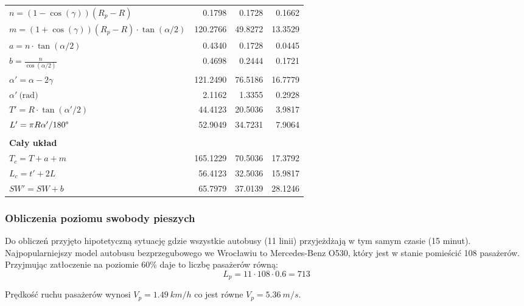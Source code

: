 \documentclass[twoside,12pt]{article}
\begin{document}
\begin{table}[H]
\begin{tabular}{lrrr}
     \midrule
     $n=(1-\cos(\gamma))(R_p-R)$ & 0.1798     & 0.1728     & 0.1662 \\
     $m=(1+\cos(\gamma))(R_p-R)\cdot\tan(\alpha/2)$ & 120.2766   & 49.8272    & 13.3529 \\
     $a=n\cdot\tan(\alpha/2)$ & 0.4340     & 0.1728     & 0.0445 \\
     $b=\frac{n}{\cos(\alpha/2)}$ & 0.4698     & 0.2444     & 0.1721 \\
     $\alpha'=\alpha-2\gamma$ & 121.2490   & 76.5186    & 16.7779 \\
     $\alpha' \ \text{(rad)}$ & 2.1162     & 1.3355     & 0.2928 \\
     $T' = R\cdot\tan(\alpha'/2)$ & 44.4123    & 20.5036    & 3.9817 \\
     $L'=\pi R \alpha'/180\degree$ & 52.9049    & 34.7231    & 7.9064 \\
     \midrule
                &            &            &  \\
     \textbf{Cały układ} &            &            &  \\
     \midrule
     $T_c=T+a+m$ & 165.1229   & 70.5036    & 17.3792 \\
     $L_c=t'+2L$ & 56.4123    & 32.5036    & 15.9817 \\
     $SW' = SW+b$ & 65.7979    & 37.0139    & 28.1246 \\
     \bottomrule
     \end{tabular}%

       \label{luki_poziome_tory}%
     \end{table}%
     
     \subsubsection{Obliczenia poziomu swobody pieszych}
     
     Do obliczeń przyjęto hipotetyczną sytuację gdzie wszystkie autobusy (11 linii) przyjeżdżają w tym samym czasie (15 minut). Najpopularniejszy model autobusu bezprzegubowego we Wrocławiu to Mercedes-Benz O530, który jest w stanie pomieścić 108 pasażerów. Przyjmując zatłoczenie na poziomie 60\% daje to liczbę pasażerów równą:
     \begin{equation}
     L_p = 11 \cdot 108 \cdot 0.6 = 713
     \end{equation}
     
     Prędkość ruchu pasażerów wynosi $V_p=\SI{1.49}{km/h}$ co jest równe $V_p = \SI{5.36}{m/s}$.
     
\end{document}
